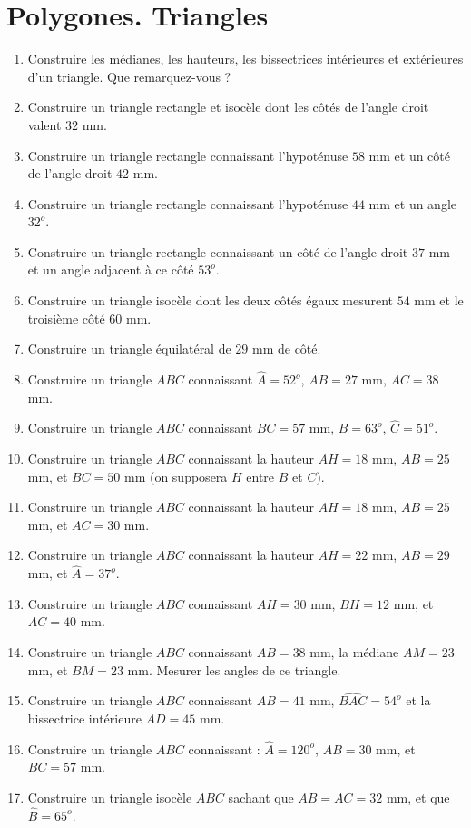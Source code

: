 \documentclass[12 pt]{report}
\theoremstyle{plain}
\newcounter{n}
\begin{document}
\chapter{Polygones. Triangles} 
\begin{enumerate}
\item Construire les médianes, les hauteurs, les bissectrices intérieures et extérieures d'un triangle. Que remarquez-vous ? 
\item Construire un triangle rectangle et isocèle dont les côtés de l'angle droit valent $32$ mm. 
\item Construire un triangle rectangle connaissant l'hypoténuse $58$ mm et un côté de 
l'angle droit $42$ mm. 
\item Construire un triangle rectangle connaissant l'hypoténuse $44$ mm et un angle
$32^o$. 
\item Construire un triangle rectangle connaissant un côté de l'angle droit $37$ mm et un angle adjacent à ce côté $53^o$. 
\item Construire un triangle isocèle dont les deux côtés égaux mesurent $54$ mm et le troisième côté $60$ mm. 
\item Construire un triangle équilatéral de $29$ mm de côté. 
\item Construire un triangle $ABC$ connaissant $\widehat{A}=52^o$, $AB=27$ mm, $AC=38$ mm. 
\item Construire un triangle $ABC$ connaissant $BC = 57$ mm, $\widehat{B}= 63^o$, $\widehat{C}= 51^o$. 
\item Construire un triangle $ABC$ connaissant la hauteur $AH=18$ mm, $AB=25$ mm, et $BC=50$ mm (on supposera $H$ entre $B$ et $C$). 
\item Construire un triangle $ABC$ connaissant la hauteur $AH= 18$ mm, $AB=25$ mm, et $AC=30$ mm.
\item Construire un triangle $ABC$ connaissant la hauteur $AH=22$ mm, $AB=29$ mm, et $\widehat{A}=37^o$. 
\item Construire un triangle $ABC$ connaissant $AH=30$ mm, $BH= 12$ mm, et $AC=40$ mm. 
\item Construire un triangle $ABC$ connaissant $AB=38$ mm, la médiane $AM=23$ mm, et $BM=23$ mm. Mesurer les angles de ce triangle. 
\item Construire un triangle $ABC$ connaissant $AB=41$ mm, $\widehat{BAC}= 54^o$
et la bissectrice intérieure $AD=45$ mm. 
\item Construire un triangle $ABC$ connaissant : $\widehat{A}= 120^o$, $AB= 30$ mm, et $BC = 57$ mm. 
\item Construire un triangle isocèle $ABC$ sachant que $AB=AC=32$ mm, et que $\widehat{B}= 65^o$. 

\end{enumerate}
\end{document}
